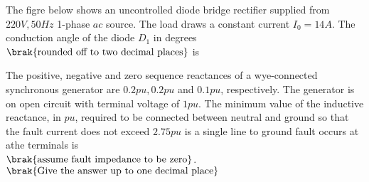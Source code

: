 \iffalse
\title{2017-EE-53-65}
\author{EE24BTECH11001 -  ADITYA TRIPATHY}
\section{ee}
\chapter{2017}
\fi

    \item 
        The figre below shows an uncontrolled diode bridge rectifier supplied from $220V, 50Hz$ 
        1-phase $ac$ source. The load draws a constant current $I_0 = 14A$. The conduction angle
        of the diode $D_1$ in degrees $\brak{\textnormal{rounded off to two decimal places}}$ is 
        \hfill{}
        \begin{center}
        \end{center}
    \item The positive, negative and zero sequence reactances of a wye-connected synchronous generator
        are $0.2 pu, 0.2 pu$ and $0.1 pu$, respectively. The generator is on open circuit with terminal 
        voltage of $1 pu$. The minimum value of the inductive reactance, in $pu$, required to be 
        connected between neutral and ground so that the fault current does not exceed $2.75 pu$ is a single
        line to ground fault occurs at athe terminals is \\
        $\brak{\textnormal{assume fault impedance to be zero}}$. $\brak{\textnormal{Give the answer up to one decimal place}}$

